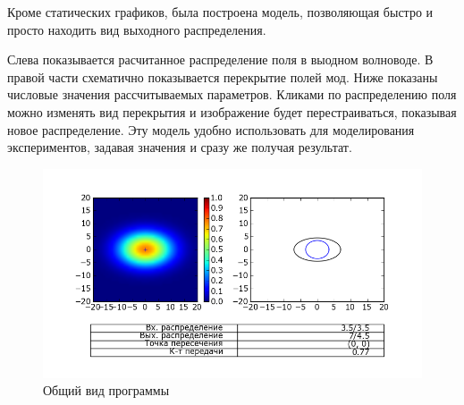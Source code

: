 Кроме статических графиков, была построена модель, позволяющая быстро и просто находить вид выходного распределения.

Слева показывается расчитанное распределение поля в выодном волноводе. В правой части схематично показывается перекрытие полей мод. Ниже показаны числовые значения рассчитываемых параметров. Кликами по распределению поля можно изменять вид перекрытия и изображение будет перестраиваться, показывая новое распределение. Эту модель удобно использовать для моделирования экспериментов, задавая значения и сразу же получая результат.

\begin{figure}[h!]
	\includegraphics[width=\linewidth]{img/heatmap.png}
	\caption{Общий вид программы}
\end{figure}
